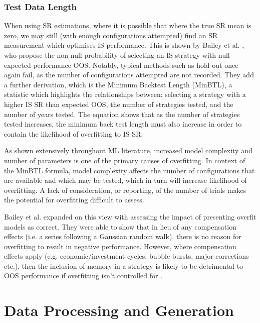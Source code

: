 \documentclass[a4paper,11pt,oneside]{article}
\theoremstyle{plain}
\theoremstyle{definition}
\begin{document}
	\subsubsection{Test Data Length}

	When using SR estimations, where it is possible that where the true SR mean is 
	zero, we may still (with enough configurations attempted) find an SR measurement which optimises IS performance. 
	This is shown by Bailey et al. \cite{BaileyBTL}, who propose the non-null probability of selecting an IS strategy with null expected 
	performance OOS. Notably, typical methods such as hold-out once again fail, as the number of configurations 
	attempted are not recorded. They add a further derivation, which is the Minimum Backtest Length (MinBTL), a statistic which highlights the relationships between: selecting a strategy with a higher IS SR than expected OOS, 
	the number of strategies tested, and the number of years tested. The equation shows that  as the number 
	of strategies tested increases, the minimum back test length must also increase in order to contain the likelihood 
	of overfitting to IS SR. 
	\hfill \break 
	
	As shown extensively throughout ML literature, increased model complexity and number of parameters is one of 
	the primary causes of overfitting. In context of the MinBTL formula, model complexity affects the number of 
	configurations that are available and which may be tested, which in turn will increase likelihood of overfitting. 
	A lack of consideration, or reporting, of the number of trials makes the potential for overfitting difficult to assess. 
	\hfill \break 
	
	Bailey et al. expanded on this view with assessing the impact of presenting overfit models as correct. 
	They were able to show that in lieu of any compensation effects (i.e. a series following a Gaussian random walk), 
	there is no reason for overfitting to result in negative performance. However, where compensation effects apply 
	(e.g. economic/investment cycles, bubble bursts, major corrections etc.), then the inclusion of memory in a strategy
	is likely to be detrimental to OOS performance if overfitting isn’t controlled for \cite{BaileyBTL}.
	\hfill \break 
	
	\newpage
	
	\section{Data Processing and Generation }\label{Data}
\end{document}

